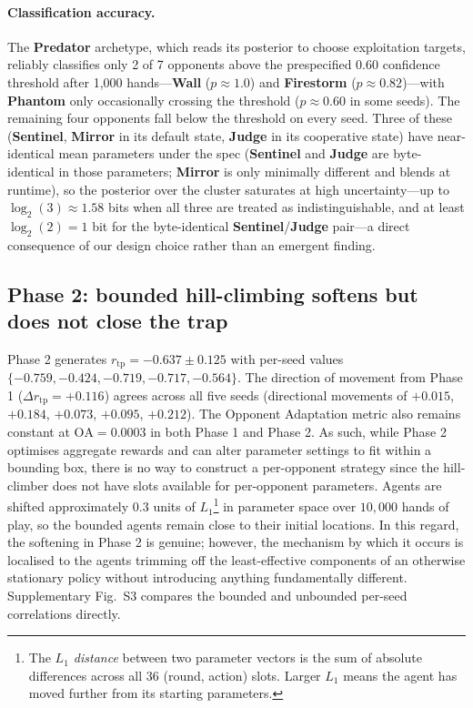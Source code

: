 \documentclass[journal]{IEEEtran}
\newcommand{\arch}[1]{\textbf{#1}}
\newcommand{\rtp}{\ensuremath{r_{\mathrm{tp}}}}
\begin{document}
\paragraph{Classification accuracy.}
The \arch{Predator} archetype, which reads its posterior to
choose exploitation targets, reliably classifies only 2 of 7
opponents above the prespecified 0.60 confidence threshold after
1{,}000 hands---\arch{Wall} ($p \approx 1.0$) and \arch{Firestorm}
($p \approx 0.82$)---with \arch{Phantom} only occasionally crossing
the threshold ($p \approx 0.60$ in some seeds). The remaining four opponents
fall below the threshold on every seed. Three of these
(\arch{Sentinel}, \arch{Mirror} in its default state,
\arch{Judge} in its cooperative state) have near-identical mean
parameters under the spec (\arch{Sentinel} and \arch{Judge} are
byte-identical in those parameters; \arch{Mirror} is only minimally
different and blends at runtime), so the posterior over the cluster saturates at high
uncertainty---up to $\log_2(3) \approx 1.58$ bits when all three are
treated as indistinguishable, and at least $\log_2(2) = 1$ bit for
the byte-identical \arch{Sentinel}/\arch{Judge} pair---a direct
consequence of our design choice rather than an emergent finding.


\subsection{Phase 2: bounded hill-climbing softens but does not
close the trap}

Phase 2 generates $\rtp = -0.637 \pm 0.125$ with per-seed values
$\{-0.759, -0.424, -0.719, -0.717, -0.564\}$. The direction of
movement from Phase 1 ($\Delta\rtp = +0.116$) agrees across all five
seeds (directional movements of $+0.015$, $+0.184$, $+0.073$,
$+0.095$, $+0.212$). The Opponent Adaptation metric also remains
constant at $\mathrm{OA} = 0.0003$ in both Phase 1 and Phase 2. As
such, while Phase 2 optimises aggregate rewards and can alter
parameter settings to fit within a bounding box, there is no way to
construct a per-opponent strategy since the hill-climber does not
have slots available for per-opponent parameters. Agents are shifted
approximately $0.3$ units of $L_1$\footnote{The \textit{$L_1$
distance} between two parameter vectors is the sum of absolute
differences across all 36 (round, action) slots. Larger $L_1$ means
the agent has moved further from its starting parameters.} in
parameter space over $10{,}000$ hands of play, so the bounded agents
remain close to their initial locations. In this regard, the
softening in Phase 2 is genuine; however, the mechanism by which it
occurs is localised to the agents trimming off the least-effective
components of an otherwise stationary policy without introducing
anything fundamentally different. Supplementary
Fig.~S3 compares the bounded and unbounded per-seed correlations
directly.
\end{document}
